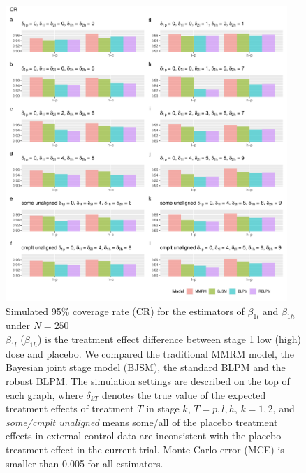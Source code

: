 \begin{figure}
\includegraphics[width=0.95\textwidth]{chapters/figures/CR_250.pdf}
\caption{Simulated 95\% coverage rate (CR) for the estimators of $\beta_{1l}$ and $\beta_{1h}$ under $N = 250$ \label{fig:CR_250}\\$\beta_{1l}$ ($\beta_{1h}$) is the treatment effect difference between stage 1 low (high) dose and placebo. We compared the traditional MMRM model, the Bayesian joint stage model (BJSM), the standard BLPM and the robust BLPM. The simulation settings are described on the top of each graph, where $\delta_{kT}$ denotes the true value of the expected treatment effects of treatment $T$ in stage $k$, $T = p, l, h$, $k = 1, 2$, and \emph{some/cmplt unaligned} means some/all of the placebo treatment effects in external control data are inconsistent with the placebo treatment effect in the current trial. Monte Carlo error (MCE) is smaller than 0.005 for all estimators.}
\end{figure}


